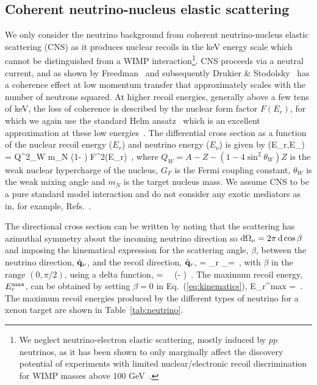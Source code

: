\subsection{Coherent neutrino-nucleus elastic scattering}
We only consider the neutrino background from coherent neutrino-nucleus elastic scattering (CNS) as it produces nuclear recoils in the keV energy scale which cannot be distinguished from a WIMP interaction\footnote{We neglect neutrino-electron elastic scattering, mostly induced by $pp$ neutrinos, as it has been shown to only marginally affect the discovery potential of experiments with limited nuclear/electronic recoil discrimination for WIMP masses above 100 GeV~\cite{Billard:2013qya}.}. CNS proceeds via a neutral current, and as shown by Freedman~\cite{Freedman:1973yd} and subsequently Drukier \& Stodolsky~\cite{Drukier:1983gj} has a coherence effect at low momentum transfer that approximately scales with the number of neutrons squared. At higher recoil energies, generally above a few tens of keV, the loss of coherence is described by the nuclear form factor $F(E_r)$, for which we again use the standard Helm ansatz~\cite{Lewin:1995rx} which is an excellent approximation at these low energies~\cite{Vietze:2014vsa}. The differential cross section as a function of the nuclear recoil energy ($E_r$) and neutrino energy ($E_\nu$) is given by 
\be
  (E_r,E_\nu) =  Q^2_W m_N \left(1- \right) F^2(E_r) \,,
\ee
where $Q_W = A-Z - (1-4\sin^2\theta_W) Z$ is the weak nuclear hypercharge of the nucleus, $G_F$ is the Fermi coupling constant, $\theta_W$ is the weak mixing angle and $m_N$ is the target nucleus mass. We assume CNS to be a pure standard model interaction and do not consider any exotic mediators as in, for example, Refs.~\cite{Cerdeno:2016sfi,Bertuzzo:2017tuf}.

The directional cross section can be written by noting that the scattering has azimuthal symmetry about the incoming neutrino direction so $\rm{d}\Omega_\nu = 2\pi \,\rm{d}\cos\beta$ and imposing the kinematical expression for the scattering angle, $\beta$, between the neutrino direction, $\hat{{\bf q}}_\nu$, and the recoil direction, $\hat{{\bf q}}_r$,
\be
 \cos\beta = _r \cdot {}_\nu =  \,,
\label{eq:kinematics}
\ee 
with $\beta$ in the range $(0,\pi/2)$, using a delta function,
\be
   =  \, \, \delta\left(\cos\beta -  \right) \,.
\label{eq:doublecrosssection}
\ee
The maximum recoil energy, $E_r^{\rm max}$, can be obtained by setting $\beta = 0$ in Eq.~(\ref{eq:kinematics}),
\be
E_r^{\rm max} =  \approx {} \,.
\ee
The maximum recoil energies produced by the different types of neutrino for a xenon target are shown in Table~\ref{tab:neutrino}.

